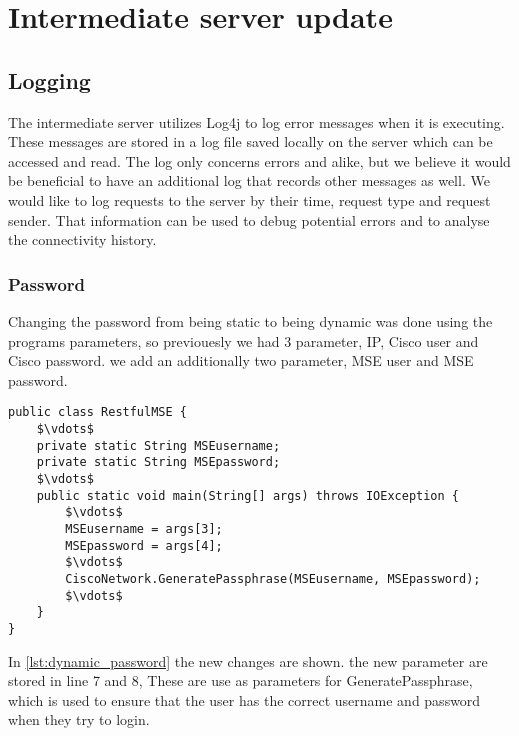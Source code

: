 \section{Intermediate server update}

\subsection*{Logging}
The intermediate server utilizes Log4j \cite{log4j} to log error messages when it is executing. These messages are stored in a log file saved locally on the server which can be accessed and read. The log only concerns errors and alike, but we believe it would be beneficial to have an additional log that records other messages as well. We would like to log requests to the server by their time, request type and request sender. That information can be used to debug potential errors and to analyse the connectivity history. 


\subsubsection*{Password}
Changing the password from being static to being dynamic was done using the programs parameters, so previouesly we had 3 parameter, IP, Cisco user and Cisco password. we add an additionally two parameter, MSE user and MSE password.

\begin{lstlisting}[caption={Failed Connection snapshot},label={lst:dynamic_password},language=inc_Java, mathescape]
public class RestfulMSE {
	$\vdots$
	private static String MSEusername;
    private static String MSEpassword;
    $\vdots$
    public static void main(String[] args) throws IOException {
    	$\vdots$
   		MSEusername = args[3];
    	MSEpassword = args[4];
    	$\vdots$
    	CiscoNetwork.GeneratePassphrase(MSEusername, MSEpassword);
    	$\vdots$
    }
}
\end{lstlisting}

In \cref{lst:dynamic_password} the new changes are shown. the new parameter are stored in line 7 and 8, These are use as parameters for GeneratePassphrase, which is used to ensure that the user has the correct username and password when they try to login.
